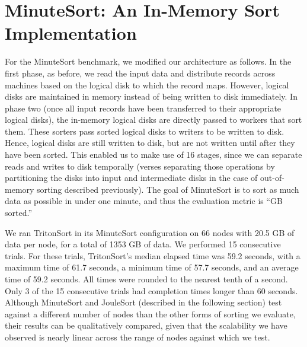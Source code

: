 \section{MinuteSort: An In-Memory Sort Implementation}
\label{sec:minutesort}

For the MinuteSort benchmark, we modified our architecture as follows. In the
first phase, as before, we read the input data and distribute records across
machines based on the logical disk to which the record maps. However, logical
disks are maintained in memory instead of being written to disk immediately.
In phase two (once all input records have been transferred to their appropriate
logical disks), the in-memory logical disks are directly passed to workers that
sort them. These sorters pass sorted logical disks to writers to be written to
disk. Hence, logical disks are still written to disk, but are not written until
after they have been sorted. This enabled us to make use of 16 \writer stages,
since we can separate reads and writes to disk temporally (verses separating
those operations by partitioning the disks into input and intermediate disks in
the case of out-of-memory sorting described previously).  The goal of
MinuteSort is to sort as much data as possible in under one minute, and thus
the evaluation metric is ``GB sorted.''

We ran TritonSort in its MinuteSort configuration on 66 nodes with 20.5 GB of
data per node, for a total of 1353 GB of data. We performed 15 consecutive
trials.  For these trials, TritonSort's median elapsed time was 59.2 seconds,
with a maximum time of 61.7 seconds, a minimum time of 57.7 seconds, and an
average time of 59.2 seconds. All times were rounded to the nearest tenth of a
second.  Only 3 of the 15 consecutive trials had completion times longer than
60 seconds.  Although MinuteSort and JouleSort (described in the following
section) test against a different number of nodes than the other forms of
sorting we evaluate, their results can be qualitatively compared, given that
the scalability we have observed is nearly linear across the range of nodes
against which we test.
